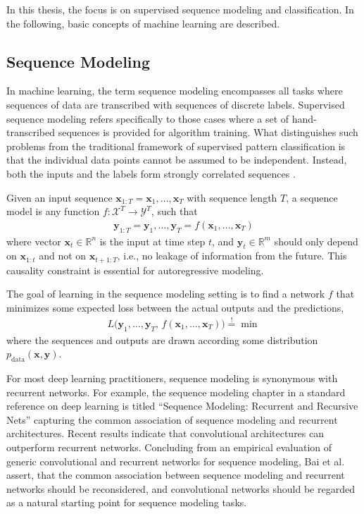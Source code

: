 \documentclass{scrartcl}
\begin{document}
In this thesis, the focus is on supervised sequence modeling and classification. In the following, basic concepts of machine learning are described. 

\subsection{Sequence Modeling}
In machine learning, the term sequence modeling encompasses all tasks where sequences of data are transcribed with sequences of discrete labels. Supervised sequence modeling refers specifically to those cases where a set of hand-transcribed sequences is provided for algorithm training. What distinguishes such problems from the traditional framework of supervised pattern classification is that the individual data points cannot be assumed to be independent. Instead, both the inputs and the labels form strongly correlated sequences \cite{Graves2012}.

Given an input sequence $\mathbf x_{1:T} = \mathbf x_1, \dots, \mathbf x_T$ with sequence length $T$, a sequence model is any function $f: \mathcal X^T \rightarrow \mathcal Y^T$, such that
\begin{align}
\mathbf y_{1:T} = \mathbf y_1, \dots, \mathbf y_T = f(\mathbf x_1,\dots, \mathbf x_T)
\end{align}
where vector $\mathbf x_t \in \mathbb R^n$ is the input at time step $t$, and $\mathbf y_t \in \mathbb R^m$ should only depend on $\mathbf x_{1:t}$ and not on $\mathbf x_{t+1:T}$, i.e., no leakage of information from the future. This causality constraint is essential for autoregressive modeling. 


The goal of learning in the sequence modeling setting is to find a network $f$ that minimizes some expected loss between the actual outputs and the predictions, 
\begin{align}
L \big( \mathbf y_1, \dots, \mathbf y_T, \, f(\mathbf x_1,\dots, \mathbf x_T) \big) \stackrel{\text{!}}{=} \min
\end{align}
where the sequences and outputs are drawn according some distribution $p_{\text{data}}(\mathbf x,\mathbf y)$.

For most deep learning practitioners, sequence modeling is synonymous with recurrent networks. For example, the sequence modeling chapter in a standard reference on deep learning is titled ``Sequence Modeling: Recurrent and Recursive Nets'' \cite{Goodfellow2016} capturing the common association of sequence modeling and recurrent architectures. Recent results indicate that convolutional architectures can outperform recurrent networks. Concluding from an empirical evaluation of generic convolutional and recurrent networks for sequence modeling, Bai et al. \cite{Bai2018} assert, that the common association between sequence modeling and recurrent networks should be reconsidered, and convolutional networks should be regarded as a natural starting point for sequence modeling tasks.
\end{document}
